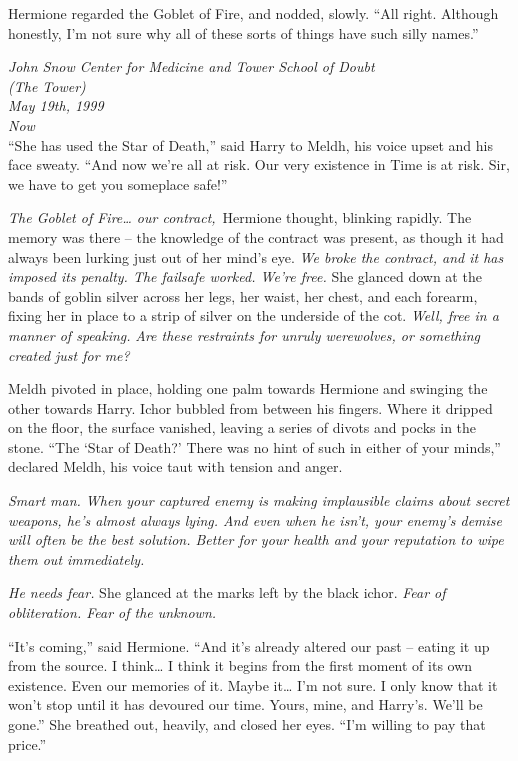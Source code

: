 Hermione regarded the Goblet of Fire, and nodded, slowly. ``All right.
Although honestly, I'm not sure why all of these sorts of things have
such silly names.''

\mybreak

\emph{John Snow Center for Medicine and Tower School of Doubt\\
(The Tower)}\\
\emph{May 19th, 1999}\\
\emph{Now}\\

``She has used the Star of Death,'' said Harry to Meldh, his voice upset
and his face sweaty. ``And now we're all at risk. Our very existence in
Time is at risk. Sir, we have to get you someplace safe!''

\emph{The Goblet of Fire\ldots{} our contract,}~Hermione thought,
blinking rapidly. The memory was there -- the knowledge of the contract
was present, as though it had always been lurking just out of her mind's
eye. \emph{We broke the contract, and it has imposed its penalty. The
failsafe worked. We're free.} She glanced down at the bands of goblin
silver across her legs, her waist, her chest, and each forearm, fixing
her in place to a strip of silver on the underside of the cot.
\emph{Well, free in a manner of speaking.} \emph{Are these restraints
for unruly werewolves, or something created just for me?}

Meldh pivoted in place, holding one palm towards Hermione and swinging
the other towards Harry. Ichor bubbled from between his fingers. Where
it dripped on the floor, the surface vanished, leaving a series of
divots and pocks in the stone. ``The `Star of Death?' There was no hint
of such in either of your minds,'' declared Meldh, his voice taut with
tension and anger.

\emph{Smart man. When your captured enemy is making implausible claims
about secret weapons, he's almost always lying. And even when he isn't,
your enemy's demise will often be the best solution. Better for your
health and your reputation to wipe them out immediately.}

\emph{He needs fear.} She glanced at the marks left by the black ichor.
\emph{Fear of obliteration. Fear of the unknown.}

``It's coming,'' said Hermione. ``And it's already altered our past --
eating it up from the source. I think\ldots{} I think it begins from the
first moment of its own existence. Even our memories of it. Maybe
it\ldots{} I'm not sure. I only know that it won't stop until it has
devoured our time. Yours, mine, and Harry's. We'll be gone.'' She
breathed out, heavily, and closed her eyes. ``I'm willing to pay that
price.''

